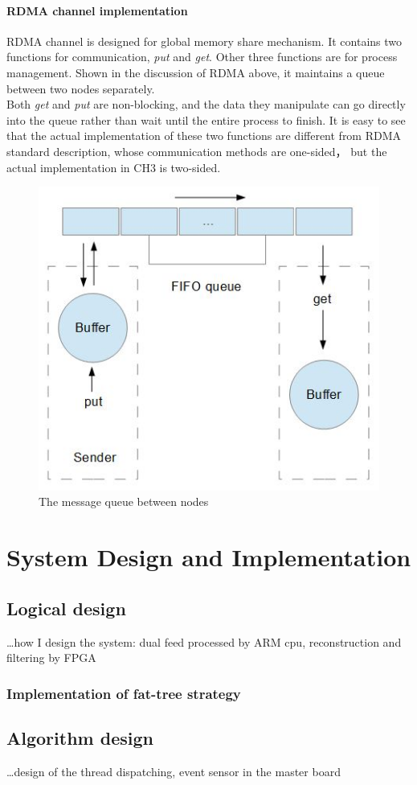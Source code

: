 \documentclass[11pt,openright,a4paper]{report}
\begin{document}
\subsubsection{RDMA channel implementation}
RDMA channel is designed for global memory share mechanism. It contains two functions for communication, \textit{put} and \textit{get}. Other three functions are for process management. Shown in the discussion of RDMA above, it maintains a queue between two nodes separately.\\
Both \textit{get} and \textit{put} are non-blocking, and the data they manipulate can go directly into the queue rather than wait until the entire process to finish. It is easy to see that the actual implementation of these two functions are different from RDMA standard description, whose communication methods are one-sided， but the actual implementation in CH3 is two-sided.\\
\begin{figure}[H]
	\centering
	\includegraphics[width=0.5\linewidth]{picture/senderreceiver}
	\caption{The message queue between nodes}
	\label{fig:senderreceiver}
\end{figure}

\chapter{System Design and Implementation}
\section{Logical design}
\dots how I design the system: dual feed processed by ARM cpu, reconstruction and filtering by FPGA 
\subsection{Implementation of fat-tree strategy}
\section{Algorithm design}
\dots design of the thread dispatching, event sensor in the master board
\end{document}
